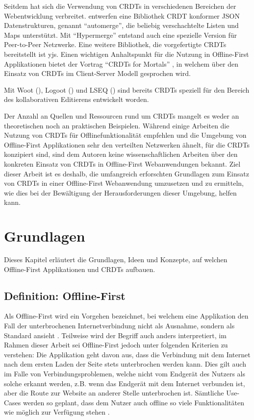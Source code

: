 \documentclass[a4paper, 12pt]{scrreprt}
\newcommand\klammercite[1]{%
	(\citealt{#1})}
\begin{document}
Seitdem hat sich die Verwendung von \acp{CRDT} in verschiedenen Bereichen der Webentwicklung verbreitet. \citet{ArticleCRDTJSON} entwerfen eine Bibliothek CRDT konformer \ac{JSON} Datenstrukturen, genannt \enquote{automerge}, die beliebig verschachtelte Listen und Maps unterstützt. Mit \enquote{Hypermerge} entstand auch eine spezielle Version für Peer-to-Peer Netzwerke. Eine weitere Bibliothek, die vorgefertigte \acp{CRDT} bereitstellt ist yjs\autocite{inproceedingsYjs}. Einen wichtigen Anhaltspunkt für die Nutzung in Offline-First Applikationen bietet der Vortrag \enquote{\acp{CRDT} for Mortals} \autocite{OnlineCrdtsForMortals}, in welchem über den Einsatz von \acp{CRDT} im Client-Server Modell gesprochen wird.  

Mit Woot \klammercite{InproceedingsCRDTWoot}, Logoot \klammercite{InproceedingsCRDTLogoot} und LSEQ \klammercite{InproceedingsCRDTLSEQ} sind bereits \acp{CRDT} speziell für den Bereich des kollaborativen Editierens entwickelt worden. 

Der Anzahl an Quellen und Ressourcen rund um \acp{CRDT} mangelt es weder an theoretischen noch an praktischen Beispielen. Während einige Arbeiten die Nutzung von \acp{CRDT} für Offlinefunktionalität empfehlen und die Umgebung von Offline-First Applikationen sehr den verteilten Netzwerken ähnelt, für die \acp{CRDT} konzipiert sind, sind dem Autoren keine wissenschaftlichen Arbeiten über den konkreten Einsatz von \acp{CRDT} in Offline-First Webanwendungen bekannt. Ziel dieser Arbeit ist es deshalb, die umfangreich erforschten Grundlagen zum Einsatz von \acp{CRDT} in einer Offline-First Webanwendung umzusetzen und zu ermitteln, wie dies bei der Bewältigung der Herausforderungen dieser Umgebung, helfen kann.

\chapter{Grundlagen}
Dieses Kapitel erläutert die Grundlagen, Ideen und Konzepte, auf welchen Offline-First Applikationen und \acp{CRDT} aufbauen. 
\section{Definition: Offline-First}\label{sec:DefinitionOfflineFirst}
Als Offline-First wird ein Vorgehen bezeichnet, bei welchem eine Applikation den Fall der unterbrochenen Internetverbindung nicht als Ausnahme, sondern als Standard ansieht \autocite{OnlineGoogleProgressiveWebApps}. Teilweise wird der Begriff auch anders interpretiert, im Rahmen dieser Arbeit sei Offline-First jedoch unter folgenden Kriterien zu verstehen: Die Applikation geht davon aus, dass die Verbindung mit dem Internet nach dem ersten Laden der Seite stets unterbrochen werden kann. Dies gilt auch im Falle von Verbindungsproblemen, welche nicht vom Endgerät des Nutzers als solche erkannt werden, z.B. wenn das Endgerät mit dem Internet verbunden ist, aber die Route zur Website an anderer Stelle unterbrochen ist. Sämtliche Use-Cases werden so geplant, dass dem Nutzer auch offline so viele Funktionalitäten wie möglich zur Verfügung stehen \autocite{ArticleDesigningOfflineFirst}. 
\end{document}

